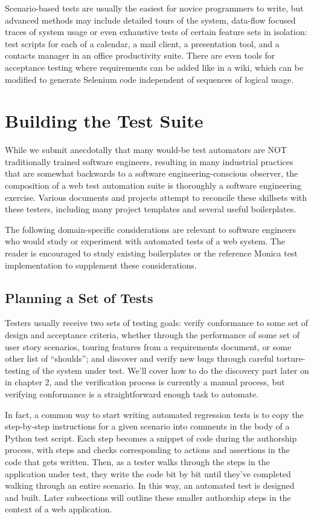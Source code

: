 Scenario-based tests are usually the easiest for novice programmers to write, but advanced methods may include detailed tours of the system, data-flow focused traces of system usage\citep{liu2000object} or even exhaustive tests of certain feature sets in isolation: test scripts for each of a calendar, a mail client, a presentation tool, and a contacts manager in an office productivity suite. There are even tools for acceptance testing where requirements can be added like in a wiki, which can be modified to generate Selenium code independent of sequences of logical usage.\citep{wang2009build}

\section{Building the Test Suite}
While we submit anecdotally that many would-be test automators are NOT traditionally trained software engineers, resulting in many industrial practices that are somewhat backwards to a software engineering-conscious observer, the composition of a web test automation suite is thoroughly a software engineering exercise. Various documents and projects attempt to reconcile these skillsets with these testers, including many project templates and several useful boilerplates. \citep{GitHubma29}

The following domain-specific considerations are relevant to software engineers who would study or experiment with automated tests of a web system. The reader is encouraged to study existing boilerplates or the reference Monica test implementation to supplement these considerations.

\subsection{Planning a Set of Tests}
Testers usually receive two sets of testing goals: verify conformance to some set of design and acceptance criteria, whether through the performance of some set of user story scenarios, touring features from a requirements document, or some other list of ``shoulds''; and discover and verify new bugs through careful torture-testing of the system under test. We'll cover how to do the discovery part later on in chapter 2, and the verification process is currently a manual process, but verifying conformance is a straightforward enough task to automate.

In fact, a common way to start writing automated regression tests is to copy the step-by-step instructions for a given scenario into comments in the body of a Python test script. Each step becomes a snippet of code during the authorship process, with steps and checks corresponding to actions and assertions in the code that gets written. Then, as a tester walks through the steps in the application under test, they write the code bit by bit until they've completed walking through an entire scenario. In this way, an automated test is designed and built.\citep{nguyen2001testing} Later subsections will outline these smaller authorship steps in the context of a web application.

